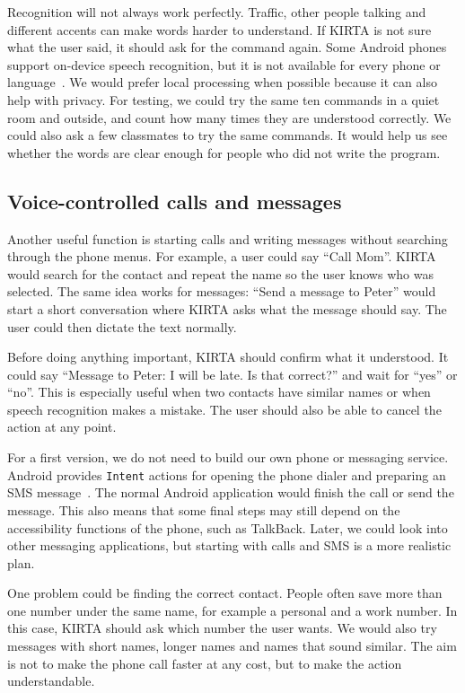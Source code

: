 \documentclass[10pt,twoside,english,a4paper]{article}
\begin{document}
Recognition will not always work perfectly. Traffic, other people talking and different accents can make words harder to understand. If KIRTA is not sure what the user said, it should ask for the command again. Some Android phones support on-device speech recognition, but it is not available for every phone or language~\cite{androidspeech}. We would prefer local processing when possible because it can also help with privacy. For testing, we could try the same ten commands in a quiet room and outside, and count how many times they are understood correctly. We could also ask a few classmates to try the same commands. It would help us see whether the words are clear enough for people who did not write the program.

\subsection*{Voice-controlled calls and messages}

Another useful function is starting calls and writing messages without searching through the phone menus. For example, a user could say ``Call Mom''. KIRTA would search for the contact and repeat the name so the user knows who was selected. The same idea works for messages: ``Send a message to Peter'' would start a short conversation where KIRTA asks what the message should say. The user could then dictate the text normally.

Before doing anything important, KIRTA should confirm what it understood. It could say ``Message to Peter: I will be late. Is that correct?'' and wait for ``yes'' or ``no''. This is especially useful when two contacts have similar names or when speech recognition makes a mistake. The user should also be able to cancel the action at any point.

For a first version, we do not need to build our own phone or messaging service. Android provides \texttt{Intent} actions for opening the phone dialer and preparing an SMS message~\cite{androidintents}. The normal Android application would finish the call or send the message. This also means that some final steps may still depend on the accessibility functions of the phone, such as TalkBack. Later, we could look into other messaging applications, but starting with calls and SMS is a more realistic plan.

One problem could be finding the correct contact. People often save more than one number under the same name, for example a personal and a work number. In this case, KIRTA should ask which number the user wants. We would also try messages with short names, longer names and names that sound similar. The aim is not to make the phone call faster at any cost, but to make the action understandable.
\end{document}
